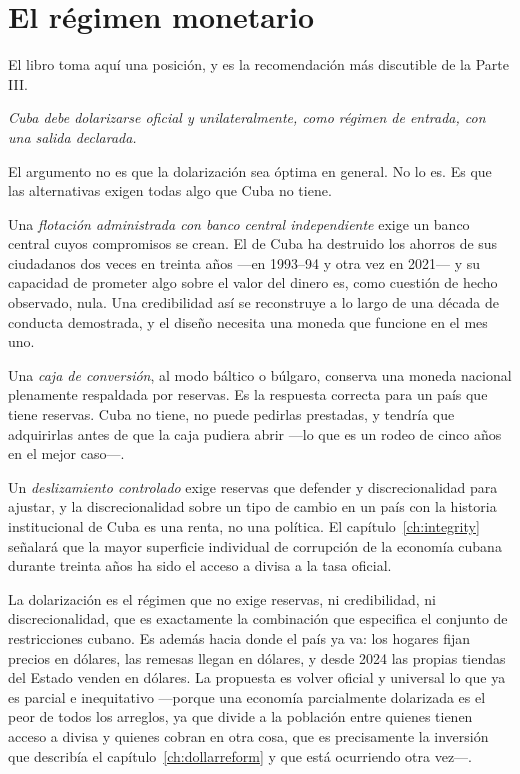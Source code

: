 \section{El régimen monetario}

El libro toma aquí una posición, y es la recomendación más discutible de la Parte III.

\emph{Cuba debe dolarizarse oficial y unilateralmente, como régimen de entrada, con una
salida declarada.}

El argumento no es que la dolarización sea óptima en general. No lo es. Es que las
alternativas exigen todas algo que Cuba no tiene.

Una \emph{flotación administrada con banco central independiente} exige un banco
central cuyos compromisos se crean. El de Cuba ha destruido los ahorros de sus
ciudadanos dos veces en treinta años ---en 1993--94 y otra vez en 2021--- y su
capacidad de prometer algo sobre el valor del dinero es, como cuestión de hecho
observado, nula. Una credibilidad así se reconstruye a lo largo de una década de
conducta demostrada, y el diseño necesita una moneda que funcione en el mes uno.

Una \emph{caja de conversión}, al modo báltico o búlgaro, conserva una moneda nacional
plenamente respaldada por reservas. Es la respuesta correcta para un país que tiene
reservas. Cuba no tiene, no puede pedirlas prestadas, y tendría que adquirirlas antes
de que la caja pudiera abrir ---lo que es un rodeo de cinco años en el mejor caso---.

Un \emph{deslizamiento controlado} exige reservas que defender y discrecionalidad para
ajustar, y la discrecionalidad sobre un tipo de cambio en un país con la historia
institucional de Cuba es una renta, no una política. El capítulo~\ref{ch:integrity}
señalará que la mayor superficie individual de corrupción de la economía cubana durante
treinta años ha sido el acceso a divisa a la tasa oficial.

La dolarización es el régimen que no exige reservas, ni credibilidad, ni
discrecionalidad, que es exactamente la combinación que especifica el conjunto de
restricciones cubano. Es además hacia donde el país ya va: los hogares fijan precios en
dólares, las remesas llegan en dólares, y desde 2024 las propias tiendas del Estado
venden en dólares. La propuesta es volver oficial y universal lo que ya es parcial e
inequitativo ---porque una economía parcialmente dolarizada es el peor de todos los
arreglos, ya que divide a la población entre quienes tienen acceso a divisa y quienes
cobran en otra cosa, que es precisamente la inversión que describía el
capítulo~\ref{ch:dollarreform} y que está ocurriendo otra vez---.

